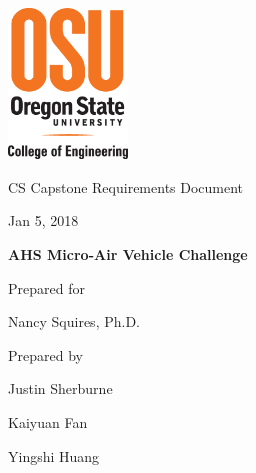 \documentclass[onecolumn, draftclsnofoot,10pt, compsoc]{IEEEtran}
\def \GroupMemberOne{			Justin Sherburne}
\def \GroupMemberTwo{			Kaiyuan Fan}
\def \GroupMemberThree{			Yingshi Huang}
\def \CapstoneProjectName{		AHS Micro-Air Vehicle Challenge}
\def \CapstoneSponsorPerson{		Nancy Squires, Ph.D.}
\newcommand{\NameSigPair}[1]{\par
\makebox[2.75in][r]{#1} \hfil 	\makebox[3.25in]{\makebox[2.25in]{\hrulefill} \hfill		\makebox[.75in]{\hrulefill}}
\par\vspace{-12pt} \textit{\tiny\noindent
\makebox[2.75in]{} \hfil		\makebox[3.25in]{\makebox[2.25in][r]{Signature} \hfill	\makebox[.75in][r]{Date}}}}
\renewcommand{\NameSigPair}[1]{#1}
\begin{document}
\newpage
	\includegraphics[height=4cm]{coe_v_spot1}
        \hfill    
        \par\vspace{.5in}
        \begin{center}
		\begin{scshape}
			\huge CS Capstone Requirements Document \par
            {\large{Jan 5, 2018}}\par
            \vspace{8pt}
            \textbf{\Huge\CapstoneProjectName}\par
			\vspace{.5in}
                        {\large Prepared for}\par
            {\Large\NameSigPair{\CapstoneSponsorPerson}\par}
			\vspace{3pt}
            {\large Prepared by }\par
            \vspace{8pt}
            {\Large
                \NameSigPair{\GroupMemberOne}\par
                \NameSigPair{\GroupMemberTwo}\par
                \NameSigPair{\GroupMemberThree}\par
            }
            \vspace{.5in}
           \end{scshape}
        \begin{abstract}
        This document is intended to define project specifications and requirements. It contains a statement of what requirements need to be met for MAV challenge, how the aircraft works, and technologies and software are used to operate the control board. This document will also include proposed solutions for various challenges, as well as project constraints. It is intended for project sponsors, collaborators, or as a resource to future projects of a similar nature.
        \end{abstract}   
        \normalsize
\end{center}
\newpage
\end{document}
